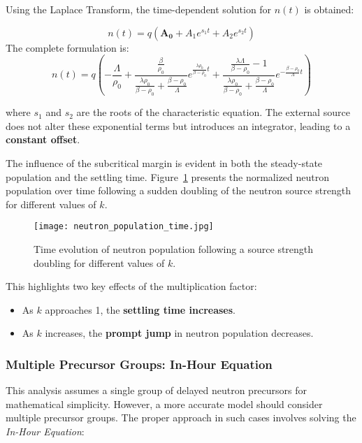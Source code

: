 Using the Laplace Transform, the time-dependent solution for $ n(t)$ is obtained:

\begin{equation}
n(t) = q \left(\mathbf{A_0} + A_1 e^{s_1 t} + A_2 e^{s_2 t}\right)
\end{equation}
The complete formulation is:
\begin{equation}
    n(t) = q \left( 
        -\frac{\Lambda}{\rho_0} 
        + \frac{\frac{\beta}{\rho_0}}{\frac{\lambda \rho_0}{\beta - \rho_0} + \frac{\beta - \rho_0}{\Lambda}} e^{\frac{\lambda \rho_0}{\beta - \rho_0} t} 
        + \frac{\frac{\lambda \Lambda}{\beta - \rho_0} - 1}{\frac{\lambda \rho_0}{\beta - \rho_0} + \frac{\beta - \rho_0}{\Lambda}} e^{-\frac{\beta - \rho_0}{\Lambda} t}
    \right)
\end{equation}

where $ s_1 $ and $ s_2 $ are the roots of the characteristic equation. The external source does not alter these exponential terms but introduces an integrator, leading to a \textbf{constant offset}.

The influence of the subcritical margin is evident in both the steady-state population and the settling time. Figure~\ref{fig:n_vs_time} presents the normalized neutron population over time following a sudden doubling of the neutron source strength for different values of $ k $.

\begin{figure}[H]
    \centering
    \texttt{[image: neutron\_population\_time.jpg]} %
    \caption{Time evolution of neutron population following a source strength doubling for different values of \( k \).}
    \label{fig:n_vs_time}
\end{figure}

This highlights two key effects of the multiplication factor:
\begin{itemize}
    \item As $ k $ approaches 1, the \textbf{settling time increases}.
    \item As  $ k $ increases, the \textbf{prompt jump} in neutron population decreases.
\end{itemize}

\subsubsection{Multiple Precursor Groups: In-Hour Equation}

This analysis assumes a single group of delayed neutron precursors for mathematical simplicity. However, a more accurate model should consider multiple precursor groups. The proper approach in such cases involves solving the \textit{In-Hour Equation}:

